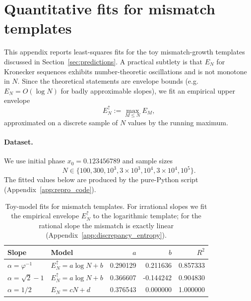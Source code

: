 \section{Quantitative fits for mismatch templates}
\label{app:fit_table}

This appendix reports least-squares fits for the toy mismatch-growth templates discussed in Section~\ref{sec:predictions}. A practical subtlety is that $E_N$ for Kronecker sequences exhibits number-theoretic oscillations and is not monotone in $N$. Since the theoretical statements are envelope bounds (e.g.\ $E_N=O(\log N)$ for badly approximable slopes), we fit an empirical upper envelope
\begin{equation}
  E_N^{\uparrow} := \max_{M\le N} E_M,
\end{equation}
approximated on a discrete sample of $N$ values by the running maximum.

\paragraph{Dataset.}
We use initial phase $x_0=0.123456789$ and sample sizes
\[
N\in\{100,300,10^3,3\times 10^3,10^4,3\times 10^4,10^5\}.
\]
The fitted values below are produced by the pure-Python script  (Appendix~\ref{app:repro_code}).

\begin{table}[H]
\centering
\begin{tabular}{l l r r r}
\toprule
Slope & Model & $a$ & $b$ & $R^2$ \\
\midrule
$\alpha=\varphi^{-1}$ & $E_N^{\uparrow}=a\log N+b$ & 0.290129 & 0.211636 & 0.857333 \\
$\alpha=\sqrt{2}-1$ & $E_N^{\uparrow}=a\log N+b$ & 0.366607 & -0.144242 & 0.904830 \\
$\alpha=1/2$ & $E_N=cN+d$ & 0.376543 & 0.000000 & 1.000000 \\
\bottomrule
\end{tabular}
\caption{Toy-model fits for mismatch templates. For irrational slopes we fit the empirical envelope $E_N^{\uparrow}$ to the logarithmic template; for the rational slope the mismatch is exactly linear (Appendix~\ref{app:discrepancy_entropy}).}
\end{table}

